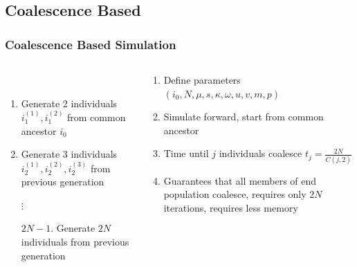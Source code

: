 \documentclass[11pt]{beamer}
\begin{document}
	\subsection{Coalescence Based}\label{subsec:coalescenceTheoryBased}
	\begin{frame}
		\frametitle{Coalescence Based Simulation}
		\begin{columns}
			\begin{column}{0.5\textwidth}
				\\ \medskip
				\tiny{
					\begin{enumerate}
						\item Generate 2 individuals $i_1^{(1)}, i_1^{(2)}$ from common ancestor $i_0$
						\item Generate 3 individuals $i_2^{(1)}, i_2^{(2)}, i_2^{(3)}$ from previous generation
						\item[$\vdots$]
						\item[$2N - 1$.] \medskip Generate $2N$ individuals from previous generation
					\end{enumerate}
				}
			\end{column}
			\begin{column}{0.5\textwidth}
				\begin{enumerate}
					\item Define parameters $(i_0, N, \mu, s, \kappa, \omega, u, v, m, p)$
					\item Simulate forward, start from common ancestor
					\item Time until $j$ individuals coalesce $t_j = \frac{2N}{C(j, 2)}$
					\item Guarantees that all members of end population coalesce, requires only $2N$ iterations,
					requires less memory
				\end{enumerate}
			\end{column}
		\end{columns}
	\end{frame}
\end{document}
